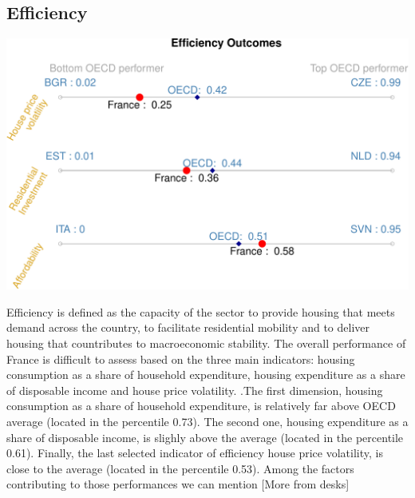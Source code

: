 \documentclass[]{article}
\begin{document}
\begin{multicols}{3}

\color{Goldenrod}
\begin{center}
\section{Efficiency}
\end{center}


\begin{center}\includegraphics{skeleton_files/figure-latex/Efficiency-1} \end{center}

\color{black}



\footnotesize
Efficiency is defined as the capacity of the sector to provide housing that meets demand across the country, to             facilitate residential mobility and to deliver housing that countributes to macroeconomic stability. The overall performance of France is difficult to assess based on the three main indicators: housing consumption as a share of household expenditure, housing expenditure as a share of disposable income and house price volatility. .The first dimension, housing consumption as a share of household expenditure, is relatively far above OECD average (located in the percentile 0.73). The second one, housing expenditure as a share of disposable income, is slighly above the average (located in the percentile 0.61). Finally, the last selected indicator of efficiency house price volatility, is close to the average (located in the percentile 0.53). Among the factors contributing to those performances we can mention [More from desks]

\columnbreak


\end{multicols}
\end{document}
